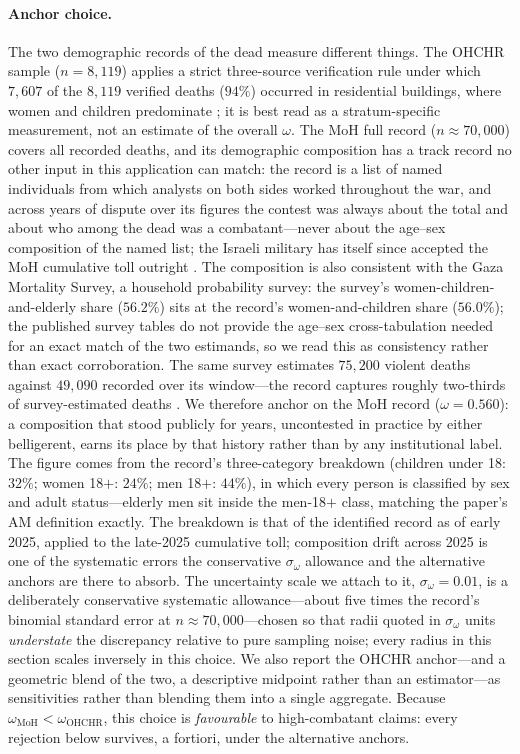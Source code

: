 \paragraph{Anchor choice.} The two demographic records of the dead measure different things. The OHCHR sample ($n=8{,}119$) applies a strict three-source verification rule under which $7{,}607$ of the $8{,}119$ verified deaths ($94\%$) occurred in residential buildings, where women and children predominate \citep{spagatcockerill2024}; it is best read as a stratum-specific measurement, not an estimate of the overall $\omega$. The MoH full record ($n\approx 70{,}000$) covers all recorded deaths, and its demographic composition has a track record no other input in this application can match: the record is a list of named individuals from which analysts on both sides worked throughout the war, and across years of dispute over its figures the contest was always about the total and about who among the dead was a combatant---never about the age--sex composition of the named list; the Israeli military has itself since accepted the MoH cumulative toll outright \citep{haaretzidf2026}. The composition is also consistent with the Gaza Mortality Survey, a household probability survey: the survey's women-children-and-elderly share ($56.2\%$) sits at the record's women-and-children share ($56.0\%$); the published survey tables do not provide the age--sex cross-tabulation needed for an exact match of the two estimands, so we read this as consistency rather than exact corroboration. The same survey estimates $75{,}200$ violent deaths against $49{,}090$ recorded over its window---the record captures roughly two-thirds of survey-estimated deaths \citep{spagatlgh2026}. We therefore anchor on the MoH record ($\omega=0.560$): a composition that stood publicly for years, uncontested in practice by either belligerent, earns its place by that history rather than by any institutional label. The figure comes from the record's three-category breakdown (children under 18: $32\%$; women 18$+$: $24\%$; men 18$+$: $44\%$), in which every person is classified by sex and adult status---elderly men sit inside the men-18$+$ class, matching the paper's $\mathrm{AM}$ definition exactly. The breakdown is that of the identified record as of early 2025, applied to the late-2025 cumulative toll; composition drift across 2025 is one of the systematic errors the conservative $\sigma_\omega$ allowance and the alternative anchors are there to absorb. The uncertainty scale we attach to it, $\sigma_\omega=0.01$, is a deliberately conservative systematic allowance---about five times the record's binomial standard error at $n\approx 70{,}000$---chosen so that radii quoted in $\sigma_\omega$ units \emph{understate} the discrepancy relative to pure sampling noise; every radius in this section scales inversely in this choice. We also report the OHCHR anchor---and a geometric blend of the two, a descriptive midpoint rather than an estimator---as sensitivities rather than blending them into a single aggregate. Because $\omega_{\mathrm{MoH}}<\omega_{\mathrm{OHCHR}}$, this choice is \emph{favourable} to high-combatant claims: every rejection below survives, a fortiori, under the alternative anchors.

